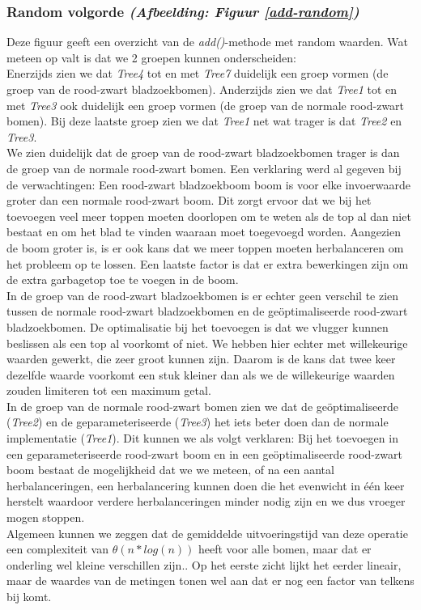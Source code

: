 \documentclass[11pt,a4paper]{report}
\begin{document}
\subsubsection{Random volgorde \textsl{(Afbeelding: Figuur \ref{add-random})}}
Deze figuur geeft een overzicht van de \textsl{add()}-methode met random waarden. Wat meteen op valt is dat we 2 groepen kunnen onderscheiden:\\
Enerzijds zien we dat \textsl{Tree4} tot en met \textsl{Tree7} duidelijk een groep vormen (de groep van de rood-zwart bladzoekbomen). Anderzijds zien we dat \textsl{Tree1} tot en met \textsl{Tree3} ook duidelijk een groep vormen (de groep van de normale rood-zwart bomen). Bij deze laatste groep zien we dat \textsl{Tree1} net wat trager is dat \textsl{Tree2} en \textsl{Tree3}.\\
We zien duidelijk dat de groep van de rood-zwart bladzoekbomen trager is dan de groep van de normale rood-zwart bomen. Een verklaring werd al gegeven bij de verwachtingen: Een rood-zwart bladzoekboom boom is voor elke invoerwaarde groter dan een normale rood-zwart boom. Dit zorgt ervoor dat we bij het toevoegen veel meer toppen moeten doorlopen om te weten als de top al dan niet bestaat en om het blad te vinden waaraan moet toegevoegd worden. Aangezien de boom groter is, is er ook kans dat we meer toppen moeten herbalanceren om het probleem op te lossen. Een laatste factor is dat er extra bewerkingen zijn om de extra garbagetop toe te voegen in de boom.\\
In de groep van de rood-zwart bladzoekbomen is er echter geen verschil te zien tussen de normale rood-zwart bladzoekbomen en de ge\"optimaliseerde rood-zwart bladzoekbomen. De optimalisatie bij het toevoegen is dat we vlugger kunnen beslissen als een top al voorkomt of niet. We hebben hier echter met willekeurige waarden gewerkt, die zeer groot kunnen zijn. Daarom is de kans dat twee keer dezelfde waarde voorkomt een stuk kleiner dan als we de willekeurige waarden zouden limiteren tot een maximum getal.\\
In de groep van de normale rood-zwart bomen zien we dat de ge\"optimaliseerde (\textsl{Tree2}) en de geparameteriseerde (\textsl{Tree3}) het iets beter doen dan de normale implementatie (\textsl{Tree1}). Dit kunnen we als volgt verklaren: Bij het toevoegen in een geparameteriseerde rood-zwart boom en in een ge\"optimaliseerde rood-zwart boom bestaat de mogelijkheid dat we we meteen, of na een aantal herbalanceringen, een herbalancering kunnen doen die het evenwicht in \'e\'en keer herstelt waardoor verdere herbalanceringen minder nodig zijn en we dus vroeger mogen stoppen.\\
Algemeen kunnen we zeggen dat de gemiddelde uitvoeringstijd van deze operatie een complexiteit van $\theta(n*log(n))$ heeft voor alle bomen, maar dat er onderling wel kleine verschillen zijn.. Op het eerste zicht lijkt het eerder lineair, maar de waardes van de metingen tonen wel aan dat er nog een factor van telkens bij komt.
\end{document}
